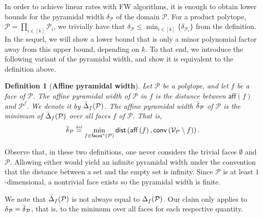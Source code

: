 \documentclass[twoside]{article}
\newcommand\linktoproof[1]{{\normalfont[{\hyperlink{proof:#1}{$\downarrow$}}]}}
\newcommand{\mP}{\mathcal{P}}
\newcommand{\mQ}{\mathcal{Q}}
\newcommand{\verts}[1]{\mathcal{V}_{#1}}
\newcommand{\conv}[1]{\mathsf{conv}\left(#1\right)}
\newcommand{\aff}[1]{\mathsf{aff}\left(#1\right)}
\newcommand{\faces}[1]{{\mathsf{faces}^\ast}\left(#1\right)}
\newcommand{\dist}[1]{\mathsf{dist}\left(#1\right)}
\newcommand{\defi}{\stackrel{\mathrm{\scriptscriptstyle def}}{=}}
\newtheorem{lemma}[theorem]{Lemma}
\newtheorem{definition}[theorem]{Definition}
\begin{document}
In order to achieve linear rates with FW algorithms, it is enough to obtain lower bounds for the pyramidal width $\delta_{\mP}$ of the domain $\mP$.
For a product polytope, $\mP = \prod_{i\in[k]}\mP_i$, we trivially have that $\delta_{\mP} \leq \min_{i\in[k]}\{\delta_{\mP_i}\}$ from the definition. 
In the sequel, we will show
a lower bound that is only a minor polynomial factor away from this upper bound, depending on $k$.
To that end, we introduce the following variant of the pyramidal width, %
and show it is equivalent to the definition above.
\begin{definition}[\textbf{Affine pyramidal width}]
  Let $\mP$ be a polytope, and let $f$ be a face of $\mP$. The \emph{affine pyramidal width} of $\mP$ in $f$ is the distance between $\aff{f}$ and $\mP^f$. We denote it by $\whatface{f}{\mP}$.
%
  The \emph{affine pyramidal width} $\what_{\mP}$ of $\mP$ is the minimum of $\whatface{f}{\mP}$ over all faces $f$ of $\mP$. That is,
\begin{equation}\label{eq:affine_pyrwidth_X}
    \what_{\mP} \defi \min_{f \in \faces{\mP}} \dist{\aff{f}, \conv{\verts{\mP} \setminus f}}.
    \vspace{0.3cm}
\end{equation}
\end{definition}

Observe that, in these two definitions, one never considers the trivial faces $\emptyset$ and $\mP$. Allowing either would yield an infinite pyramidal width under the convention that the distance between a set and the empty set is infinity. Since $\mP$ is at least $1$-dimensional, a nontrivial face exists so the pyramidal width is finite.

We note 
that $\whatface{f}{\mP}$ is not always equal to $\wface{f}{\mP}$. Our claim only applies to $\w{\mP} = \what_{\mP}$, that is, to the minimum over all faces for each respective quantity.
\end{document}
